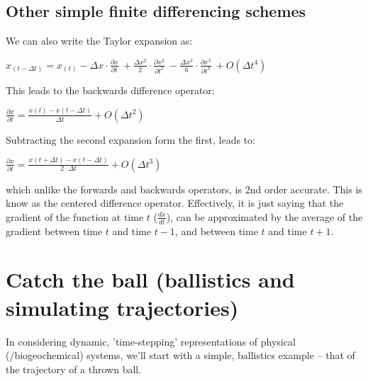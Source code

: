 \documentclass{tufte-book} %
\begin{document}

\subsection*{Other simple finite differencing schemes}

We can also write the Taylor expansion as:

\vspace{2mm}\(
x_{(t-\Delta t)}=x_{(t)} - \Delta x\cdot\frac{\partial x}{\partial t}\ + \frac{\Delta x^{2}}{2}\cdot\frac{\partial x^{2}}{\partial t^{2}}\ - \frac{\Delta x^{3}}{6}\cdot\frac{\partial x^{3}}{\partial t^{3}}\ + O(\Delta t^{4})
\)\vspace{2mm}

\noindent This leads to the backwards difference operator:

\vspace{2mm}\(
\frac{\partial x}{\partial t} = \frac{x(t)-x(t-\Delta t)}{\Delta t} + O(\Delta t^{2})
\)\vspace{2mm}

\noindent Subtracting the second expansion form the first, leads to:

\vspace{2mm}\(
\frac{\partial x}{\partial t} = \frac{x(t+\Delta t)-x(t-\Delta t)}{2\cdot\Delta t} + O(\Delta t^{3})
\)\vspace{2mm}

\noindent which unlike the forwards and backwards operators, is 2nd order accurate. This is know as the centered difference operator. Effectively, it is just saying that the gradient of the function at time \(t\) (\(\frac{dx}{dt}\)), can be approximated by the average of the gradient between time \(t\) and time \(t-1\), and between  time \(t\) and time \(t+1\).


\newpage


\section{Catch the ball (ballistics and simulating trajectories)}

In considering dynamic, 'time-stepping' representations of physical (/biogeochemical) systems, we'll start with a simple, ballistics example -- that of the trajectory of a thrown ball.
\end{document}
